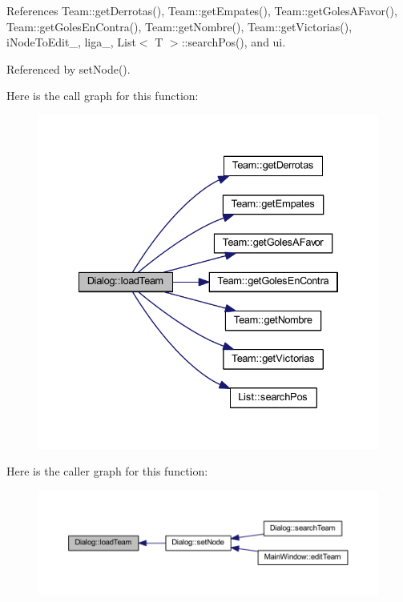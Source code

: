 References Team\+::get\+Derrotas(), Team\+::get\+Empates(), Team\+::get\+Goles\+A\+Favor(), Team\+::get\+Goles\+En\+Contra(), Team\+::get\+Nombre(), Team\+::get\+Victorias(), i\+Node\+To\+Edit\+\_\+, liga\+\_\+, List$<$ T $>$\+::search\+Pos(), and ui.



Referenced by set\+Node().



Here is the call graph for this function\+:\nopagebreak
\begin{figure}[H]
\begin{center}
\leavevmode
\includegraphics[width=334pt]{df/da9/class_dialog_a6f6564b3dab010fadb064d1bb46ac37c_cgraph}
\end{center}
\end{figure}




Here is the caller graph for this function\+:\nopagebreak
\begin{figure}[H]
\begin{center}
\leavevmode
\includegraphics[width=350pt]{df/da9/class_dialog_a6f6564b3dab010fadb064d1bb46ac37c_icgraph}
\end{center}
\end{figure}


